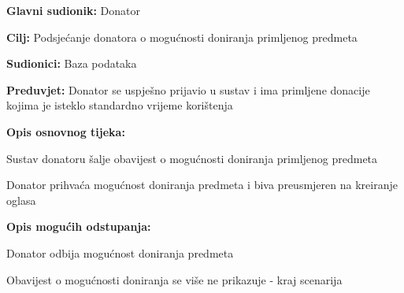 					\noindent {}
					\begin{packed_item}
	
						\item \textbf{Glavni sudionik: }Donator
						\item  \textbf{Cilj:} Podsjećanje donatora o mogućnosti doniranja primljenog predmeta
						\item  \textbf{Sudionici:} Baza podataka
						\item  \textbf{Preduvjet:} Donator se uspješno prijavio u sustav i ima primljene donacije kojima je isteklo standardno vrijeme korištenja
						\item  \textbf{Opis osnovnog tijeka:}
						
						\item[] \begin{packed_enum}
							\item Sustav donatoru šalje obavijest o mogućnosti doniranja primljenog predmeta
							\item Donator prihvaća mogućnost doniranja predmeta i biva preusmjeren na kreiranje oglasa
						\end{packed_enum}

						\item  \textbf{Opis mogućih odstupanja:}

						\item[] \begin{packed_item}
							\item[2.a] Donator odbija mogućnost doniranja predmeta
							\item[] \begin{packed_enum}
								
								\item Obavijest o mogućnosti doniranja se više ne prikazuje - kraj scenarija
							
							\end{packed_enum}	
						\end{packed_item}
					\end{packed_item}

